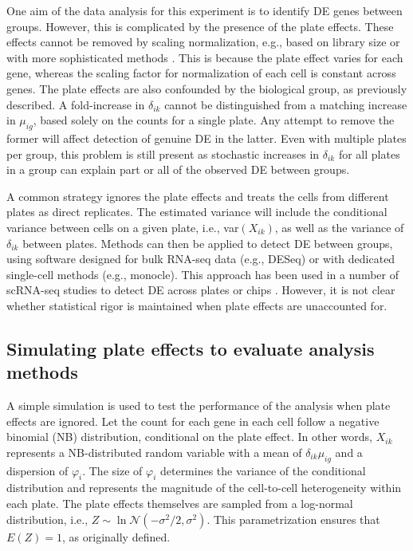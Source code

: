 \documentclass[oupdraft]{bio}
\begin{document}
One aim of the data analysis for this experiment is to identify DE genes between groups.
However, this is complicated by the presence of the plate effects.
These effects cannot be removed by scaling normalization, e.g., based on library size or with more sophisticated methods \citep{anders2010differential,robinson2010scaling}.
This is because the plate effect varies for each gene, whereas the scaling factor for normalization of each cell is constant across genes.
The plate effects are also confounded by the biological group, as previously described.
A fold-increase in $\delta_{ik}$ cannot be distinguished from a matching increase in $\mu_{ig}$, based solely on the counts for a single plate.
Any attempt to remove the former will affect detection of genuine DE in the latter.
Even with multiple plates per group, this problem is still present as stochastic increases in $\delta_{ik}$ for all plates in a group can explain part or all of the observed DE between groups.

A common strategy ignores the plate effects and treats the cells from different plates as direct replicates.
The estimated variance will include the conditional variance between cells on a given plate, i.e., var$(X_{ik})$, as well as the variance of $\delta_{ik}$ between plates.
Methods can then be applied to detect DE between groups, using software designed for bulk RNA-seq data (e.g., DESeq) or with dedicated single-cell methods (e.g., monocle).
This approach has been used in a number of scRNA-seq studies to detect DE across plates or chips \citep{kolod2015single,trapnell2014dynamics,avraham2015pathogen}.
However, it is not clear whether statistical rigor is maintained when plate effects are unaccounted for.


\subsection{Simulating plate effects to evaluate analysis methods}
A simple simulation is used to test the performance of the analysis when plate effects are ignored.
Let the count for each gene in each cell follow a negative binomial (NB) distribution, conditional on the plate effect.
In other words, $X_{ik}$ represents a NB-distributed random variable with a mean of $\delta_{ik}\mu_{ig}$ and a dispersion of $\varphi_{i}$.
The size of $\varphi_{i}$ determines the variance of the conditional distribution and represents the magnitude of the cell-to-cell heterogeneity within each plate.
The plate effects themselves are sampled from a log-normal distribution, i.e., $Z \sim \ln \mathcal{N}(-\sigma^2/2, \sigma^2)$.
This parametrization ensures that $E(Z)=1$, as originally defined.
\end{document}
